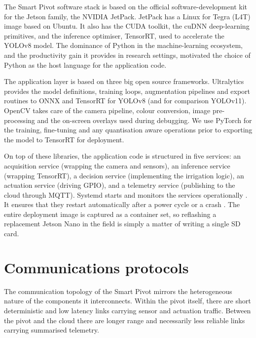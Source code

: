 \documentclass[12pt,a4paper]{report}
\begin{document}
The Smart Pivot software stack is based on the official software-development kit for the Jetson family, the NVIDIA JetPack. JetPack has a Linux for Tegra (L4T) image based on Ubuntu. It also has the CUDA toolkit, the cuDNN deep-learning primitives, and the inference optimiser, TensorRT, used to accelerate the YOLOv8 model. The dominance of Python in the machine-learning ecosystem, and the productivity gain it provides in research settings, motivated the choice of Python as the host language for the application code.

The application layer is based on three big open source frameworks. Ultralytics provides the model definitions, training loops, augmentation pipelines and export routines to ONNX and TensorRT for YOLOv8 (and for comparison YOLOv11). OpenCV takes care of the camera pipeline, colour conversion, image pre-processing and the on-screen overlays used during debugging. We use PyTorch for the training, fine-tuning and any quantisation aware operations prior to exporting the model to TensorRT for deployment.

On top of these libraries, the application code is structured in five services: an acquisition service (wrapping the camera and sensors), an inference service (wrapping TensorRT), a decision service (implementing the irrigation logic), an actuation service (driving GPIO), and a telemetry service (publishing to the cloud through MQTT). Systemd starts and monitors the services operationally . It ensures that they restart automatically after a power cycle or a crash . The entire deployment image is captured as a container set, so reflashing a replacement Jetson Nano in the field is simply a matter of writing a single SD card.

\section{Communications protocols}

The communication topology of the Smart Pivot mirrors the heterogeneous nature of the components it interconnects. Within the pivot itself, there are short deterministic and low latency links carrying sensor and actuation traffic. Between the pivot and the cloud there are longer range and necessarily less reliable links carrying summarised telemetry.
\end{document}
